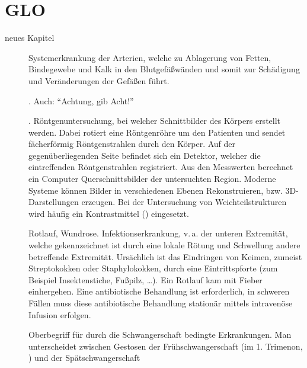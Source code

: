 \documentclass[
ngerman,
paper=a4,
asymmetric,
fontsize=10pt,
draft=false,
numbers=noenddot,
bibtotocnumbered,
footnotes=multiple,
]{scrreprt}
\newcommand{\jNEU}{\vspace{6pt}\noindent{\color{green}\sffamily\textbf{ADDED}\hrulefill\newline}}
\newcommand{\jNEUende}{\newline{\color{green}\rule{\linewidth}{3pt}\newline}}
\begin{document}
\jNEU
{}
\jNEUende


\section{GLO}
neues Kapitel

\jNEU

\begin{description}
  \item[] Systemerkrankung der
  Arterien, welche zu Ablagerung von Fetten, Bindegewebe und Kalk in
  den Blutgefäßwänden und somit zur Schädigung und
  Veränderungen der Gefäßen führt.
  \item[]
  \item[]    . Auch: \enquote{Achtung, gib Acht!}
  \item[]  .
  Röntgenuntersuchung, bei welcher Schnittbilder des
  Körpers erstellt werden. Dabei rotiert  eine
  Röntgenröhre um den Patienten und sendet
  fächerförmig Röntgenstrahlen durch den Körper. Auf der
  gegenüberliegenden Seite  befindet sich ein Detektor,
  welcher die eintreffenden Röntgenstrahlen registriert. Aus
  den Messwerten berechnet ein Computer
  Querschnittsbilder der untersuchten Region. Moderne
  Systeme können Bilder in verschiedenen Ebenen
  Rekonstruieren, bzw. 3D-Darstellungen erzeugen. Bei der
  Untersuchung von Weichteilstrukturen wird häufig ein
  Kontrastmittel ()
  eingesetzt.
  \item[]  Rotlauf, Wundrose. \label{topic:erysipel}
  Infektionserkrankung, v.\,a. der unteren Extremität, welche
  gekennzeichnet ist durch eine lokale Rötung und Schwellung 
  andere betreffende Extremität. Ursächlich ist das
  Eindringen von Keimen, zumeist Streptokokken oder
  Staphylokokken, durch eine Eintrittspforte (zum Beispiel
  Insektenstiche, Fußpilz, \ldots). Ein Rotlauf kam mit 
  Fieber einhergehen. Eine antibiotische Behandlung ist
   erforderlich, in schweren Fällen muss diese
  antibiotische Behandlung stationär mittels intravenöse
  Infusion erfolgen.
  \item[] Oberbegriff für durch die
  Schwangerschaft bedingte Erkrankungen. Man unterscheidet
  zwischen Gestosen der Frühschwangerschaft (im
  1. Trimenon, ) und der Spätschwangerschaft

\end{description}
\end{document}
